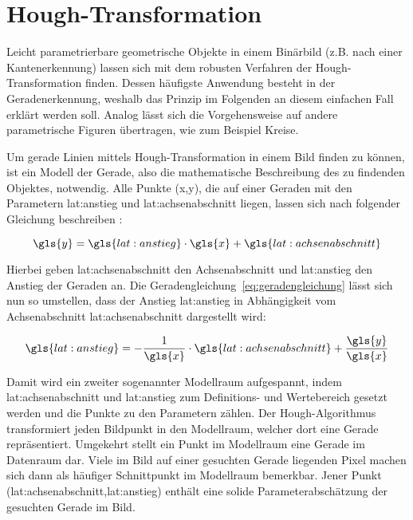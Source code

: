 \section{Hough-Transformation \dcfirstauthorshort}
\label{sec:grundlagen:hough}

Leicht parametrierbare geometrische Objekte in einem Binärbild (z.B. nach einer Kantenerkennung) lassen sich mit dem robusten Verfahren der Hough-Transformation finden. Dessen häufigste Anwendung besteht in der Geradenerkennung, weshalb das Prinzip im Folgenden an diesem einfachen Fall erklärt werden soll. Analog lässt sich die Vorgehensweise auf andere parametrische Figuren übertragen, wie zum Beispiel Kreise.

Um gerade Linien mittels Hough-Transformation in einem Bild finden zu können, ist ein Modell der Gerade, also die mathematische Beschreibung des zu findenden Objektes, notwendig. Alle Punkte (\gls{x},\gls{y}), die auf einer Geraden mit den Parametern \gls{lat:anstieg} und \gls{lat:achsenabschnitt} liegen, lassen sich nach folgender Gleichung beschreiben \autocite{jaehneDigitaleBildverarbeitungMit2005}:

\begin{equation}
\gls{y} = \gls{lat:anstieg} \cdot \gls{x} + \gls{lat:achsenabschnitt}
\label{eq:geradengleichung}
\end{equation}

Hierbei geben \gls{lat:achsenabschnitt} den Achsenabschnitt und \gls{lat:anstieg} den Anstieg der Geraden an. Die Geradengleichung~\ref{eq:geradengleichung} lässt sich nun so umstellen, dass der Anstieg \gls{lat:anstieg} in Abhängigkeit vom Achsenabschnitt \gls{lat:achsenabschnitt}  dargestellt wird:

\begin{equation}
\gls{lat:anstieg} = -\frac{1}{\gls{x}} \cdot \gls{lat:achsenabschnitt} + \frac{\gls{y}}{\gls{x}}
\end{equation}

Damit wird ein zweiter sogenannter Modellraum aufgespannt, indem \gls{lat:achsenabschnitt} und \gls{lat:anstieg} zum Definitions- und Wertebereich gesetzt werden und die Punkte zu den Parametern zählen. Der Hough-Algorithmus transformiert jeden Bildpunkt in den Modellraum, welcher dort eine Gerade repräsentiert. Umgekehrt stellt ein Punkt im Modellraum eine Gerade im Datenraum dar. Viele im Bild auf einer gesuchten Gerade liegenden Pixel machen sich dann als häufiger Schnittpunkt im Modellraum bemerkbar. Jener Punkt (\gls{lat:achsenabschnitt},\gls{lat:anstieg}) enthält eine solide Parameterabschätzung der gesuchten Gerade im Bild.

